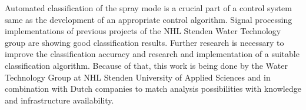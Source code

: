 Automated classification of the spray mode is a crucial part of a control system same as the development of an appropriate control algorithm. 
Signal processing implementations of previous projects of the NHL Stenden Water Technology group are showing good classification results.
Further research is necessary to improve the classification accuracy and research and implementation of a suitable classification algorithm. 
Because of that, this work is being done by the Water Technology Group at NHL Stenden University of Applied Sciences and in combination with Dutch companies to match analysis possibilities with knowledge and infrastructure availability.




